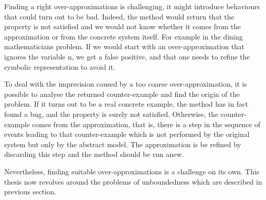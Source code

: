 Finding a right over-approximations  is challenging, it might introduce
behaviours that could turn out to be bad.  Indeed, the method would
return that the property is not satisfied and we would not know
whether it comes from the approximation  or from the concrete system
itself.
For example in the dining mathematicians problem. If we would start with an over-approximation that ignores the variable n, we get a false
  positive, and that one  needs to refine the symbolic representation to
  avoid it.

To deal with the imprecision caused by a too coarse
over-approximation, it is possible to analyse the returned
counter-example and find the origin of the problem. If it turns out to
be a real concrete example, the method has in fact found a bug, and
the property is surely not satisfied. Otherwise, the counter-example
comes from the approximation, that is, there is a step in the sequence
of events leading to that counter-example which is not performed by
the original system but only by the abstract model. The approximation
is be refined by discarding this step and the method should be run
anew.

Nevertheless, finding suitable over-approximations is a challenge on
its own. %
This thesis now revolves around the problems of unboundedness which are described in previous section.
